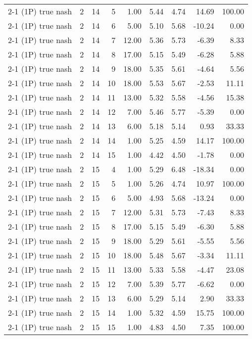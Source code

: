 \begin{tabular}{lrrrrrrrr}
2-1 (1P) true nash & 2 & 14 & 5 & 1.00 & 5.44 & 4.74 & 14.69 & 100.00 \\
2-1 (1P) true nash & 2 & 14 & 6 & 5.00 & 5.10 & 5.68 & -10.24 & 0.00 \\
2-1 (1P) true nash & 2 & 14 & 7 & 12.00 & 5.36 & 5.73 & -6.39 & 8.33 \\
2-1 (1P) true nash & 2 & 14 & 8 & 17.00 & 5.15 & 5.49 & -6.28 & 5.88 \\
2-1 (1P) true nash & 2 & 14 & 9 & 18.00 & 5.35 & 5.61 & -4.64 & 5.56 \\
2-1 (1P) true nash & 2 & 14 & 10 & 18.00 & 5.53 & 5.67 & -2.53 & 11.11 \\
2-1 (1P) true nash & 2 & 14 & 11 & 13.00 & 5.32 & 5.58 & -4.56 & 15.38 \\
2-1 (1P) true nash & 2 & 14 & 12 & 7.00 & 5.46 & 5.77 & -5.39 & 0.00 \\
2-1 (1P) true nash & 2 & 14 & 13 & 6.00 & 5.18 & 5.14 & 0.93 & 33.33 \\
2-1 (1P) true nash & 2 & 14 & 14 & 1.00 & 5.25 & 4.59 & 14.17 & 100.00 \\
2-1 (1P) true nash & 2 & 14 & 15 & 1.00 & 4.42 & 4.50 & -1.78 & 0.00 \\
2-1 (1P) true nash & 2 & 15 & 4 & 1.00 & 5.29 & 6.48 & -18.34 & 0.00 \\
2-1 (1P) true nash & 2 & 15 & 5 & 1.00 & 5.26 & 4.74 & 10.97 & 100.00 \\
2-1 (1P) true nash & 2 & 15 & 6 & 5.00 & 4.93 & 5.68 & -13.24 & 0.00 \\
2-1 (1P) true nash & 2 & 15 & 7 & 12.00 & 5.31 & 5.73 & -7.43 & 8.33 \\
2-1 (1P) true nash & 2 & 15 & 8 & 17.00 & 5.15 & 5.49 & -6.30 & 5.88 \\
2-1 (1P) true nash & 2 & 15 & 9 & 18.00 & 5.29 & 5.61 & -5.55 & 5.56 \\
2-1 (1P) true nash & 2 & 15 & 10 & 18.00 & 5.48 & 5.67 & -3.34 & 11.11 \\
2-1 (1P) true nash & 2 & 15 & 11 & 13.00 & 5.33 & 5.58 & -4.47 & 23.08 \\
2-1 (1P) true nash & 2 & 15 & 12 & 7.00 & 5.39 & 5.77 & -6.62 & 0.00 \\
2-1 (1P) true nash & 2 & 15 & 13 & 6.00 & 5.29 & 5.14 & 2.90 & 33.33 \\
2-1 (1P) true nash & 2 & 15 & 14 & 1.00 & 5.32 & 4.59 & 15.75 & 100.00 \\
2-1 (1P) true nash & 2 & 15 & 15 & 1.00 & 4.83 & 4.50 & 7.35 & 100.00 \\
\bottomrule
\end{tabular}
